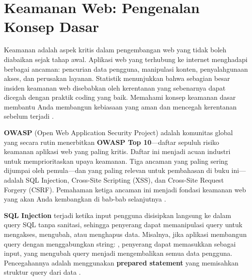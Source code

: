 ﻿\section{Keamanan Web: Pengenalan Konsep Dasar}
Keamanan adalah aspek kritis dalam pengembangan web yang tidak boleh diabaikan sejak tahap awal. Aplikasi web yang terhubung ke internet menghadapi berbagai ancaman: pencurian data pengguna, manipulasi konten, penyalahgunaan akses, dan perusakan layanan. Statistik menunjukkan bahwa sebagian besar insiden keamanan web disebabkan oleh kerentanan yang sebenarnya dapat dicegah dengan praktik coding yang baik. Memahami konsep keamanan dasar membantu Anda membangun kebiasaan yang aman dan mencegah kerentanan sebelum terjadi \cite{owaspXss}.

\textbf{OWASP} (Open Web Application Security Project) adalah komunitas global yang secara rutin menerbitkan \textbf{OWASP Top 10}---daftar sepuluh risiko keamanan aplikasi web yang paling kritis. Daftar ini menjadi acuan industri untuk memprioritaskan upaya keamanan. Tiga ancaman yang paling sering dijumpai oleh pemula---dan yang paling relevan untuk pembahasan di buku ini---adalah SQL Injection, Cross-Site Scripting (XSS), dan Cross-Site Request Forgery (CSRF). Pemahaman ketiga ancaman ini menjadi fondasi keamanan web yang akan Anda kembangkan di bab-bab selanjutnya \cite{owaspXss}.

\textbf{SQL Injection} terjadi ketika input pengguna disisipkan langsung ke dalam query SQL tanpa sanitasi, sehingga penyerang dapat memanipulasi query untuk mengakses, mengubah, atau menghapus data. Misalnya, jika aplikasi membangun query dengan menggabungkan string: , penyerang dapat memasukkan  sebagai input, yang mengubah query menjadi mengembalikan semua data pengguna. Pencegahannya adalah menggunakan \textbf{prepared statement} yang memisahkan struktur query dari data \cite{phpRightWay}.


